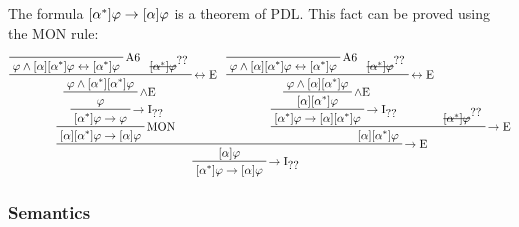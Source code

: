 \begin{example}
The formula $[\alpha^*] \varphi \to [\alpha] \varphi$ is a theorem of PDL. This fact can be proved using the MON rule:
%
\begin{displaymath}
\begin{prfenv}
\prftree[r]{$\to\text{I}_{\prfref<assum:x>}$}{
\prfboundedstyle=1
\prftree[r]{$\to\text{E}$}{
\prftree[r]{MON}{
\prftree[r]{$\to\text{I}_{\prfref<assum:y>}$}{
\prftree[r]{$\land\text{E}$}{
\prftree[r]{$\liff\text{E}$}{
\prfbyaxiom{A6}{\phi \land \necess{\alpha}{\necess{\iter \alpha}{\phi}} \liff \necess{\iter \alpha}{\phi}}
}{
\prfboundedassumption<assum:y>{\necess{\iter \alpha}{\phi}}
}{
\phi \land \necess{\iter \alpha}{\necess{\iter \alpha}{\phi}}
}
}{
\phi
}
}{
\necess{\iter \alpha}{\phi} \to \phi
}
}{
\necess{\alpha}{\necess{\iter \alpha}{\phi}} \to \necess{\alpha}{\phi}
}
}{
\prftree[r]{$\to\text{E}$}{
\prftree[r]{$\to\text{I}_{\prfref<assum:z>}$}{
\prftree[r]{$\land\text{E}$}{
\prftree[r]{$\liff\text{E}$}{
\prfbyaxiom{A6}{\phi \land \necess{\alpha}{\necess{\iter \alpha}{\phi}} \liff \necess{\iter \alpha}{\phi}}
}{
\prfboundedassumption<assum:z>{\necess{\iter \alpha}{\phi}}
}{
\phi \land \necess{\alpha}{\necess{\iter \alpha}{\phi}}
}
}{
\necess{\alpha}{\necess{\iter \alpha}{\phi}}
}
}{
\necess{\iter \alpha}{\phi} \to \necess{\alpha}{\necess{\iter \alpha}{\phi}}
}
}{
\prfboundedassumption<assum:x>{\necess{\iter \alpha}{\phi}}
}{
\necess{\alpha}{\necess{\iter \alpha}{\phi}}
}
}{
\necess{\alpha}{\phi}
}
}{
\necess{\iter \alpha}{\phi} \to \necess{\alpha}{\phi}
}
\end{prfenv}
\end{displaymath}
\end{example}

\subsubsection{Semantics}

